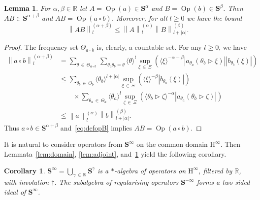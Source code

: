 \documentclass[10pt]{amsart}
\newtheorem{lemm}[theo]{Lemma}\newtheorem{prop}[theo]{Proposition}\newtheorem{coro}[theo]{Corollary}\newtheorem{conj}[theo]{Conjecture}
\theoremstyle{definition}\newtheorem{defi}[theo]{Definition}\newtheorem{rema}[theo]{Remark}\newtheorem{exam}[theo]{Example}\newtheorem{nota}[theo]{Notation}
\DeclareMathOperator{\Op}{Op}
\renewcommand{\mathsf}{\mathrm}
\newcommand{\sfH}{\mathsf{H}}
\newcommand{\R}{\mathbb R}
\newcommand{\BS}{\mathbf S}
\newcommand{\act}{\triangleright}
\newcommand{\abs}[1]{\left\lvert #1 \right\rvert}
\newcommand{\snorm}[3]{\left\| #1\right\|_{#3}^{(#2)}}
\newcommand{\ang}[1]{\langle #1 \rangle}
\begin{document}
\begin{lemm}\label{lem:product}
For $\alpha, \beta\in \R$ let $A = \Op(a) \in \BS^{\alpha}$ and $B = \Op(b) \in \BS^{\beta}$. Then $AB\in\BS^{\alpha+\beta}$ and $AB =\Op(a\circ b)$. Moreover, for all $l \ge 0$ we have the bound
\begin{equation}\label{eq:product}
\snorm{AB}{\alpha+\beta}{l} \leq
\snorm{A}{\alpha}{l}\snorm{B}{\beta}{l + \abs{\alpha}}.
\end{equation}
\end{lemm}

\begin{proof}
The frequency set $\Theta_{a\circ b}$ is, clearly, a countable set. For any $l \ge 0$, we have
\begin{equation}
\begin{aligned}
\snorm{a\circ b}{\alpha + \beta}{l} &= \sum_{\theta\,\in\,\Theta_{a\circ b}}
\,\sum_{\theta_a\theta_b = \theta} \ang{\theta}^l
\sup_{\xi\,\in\,\Xi} \left(\ang{\xi}^{-\alpha - \beta}
\abs{a_{\theta_a}(\theta_b\act\xi)}\abs{b_{\theta_b}(\xi)}\right) \\
&\le \sum_{\theta_b\,\in\,\Theta_b} \ang{\theta_b}^{l + \abs{\alpha}}
\sup_{\xi\,\in\,\Xi}\left(\ang{\xi}^{-\beta}
\abs{b_{\theta_b}(\xi)}\right)\\
&\qquad \times \sum_{\theta_a\,\in\,\Theta_a}\ang{\theta_a}^{l}
\sup_{\zeta\,\in\,\Xi}\left(\ang{\theta_b \act \zeta}^{-\alpha}
\abs{a_{\theta_a}(\theta_b \act \zeta)}\right) \\
&\le \snorm{a}{\alpha}{l} \snorm{b}{\beta}{l + \abs{\alpha}}.
\end{aligned}
\end{equation}
Thus $a\circ b\in \BS^{\alpha + \beta}$ and~\eqref{eq:defopB} implies $AB =\Op(a\circ b)$.
\end{proof}

It is natural to consider operators from $\BS^\infty$ on the common domain $\sfH^\infty$. Then Lemmata~\ref{lem:domain}, \ref{lem:adjoint}, and~\ref{lem:product} yield the following corollary.
\begin{coro}
$\BS^\infty=\bigcup_{\gamma\,\in\,\R}\BS^\gamma$ is a $*$-algebra of operators on $\sfH^\infty$, filtered by $\R$, with involution $\dagger$. The subalgebra of regularising operators $\BS^{-\infty}$ forms a two-sided ideal of $\BS^\infty$.
\end{coro}
\end{document}
